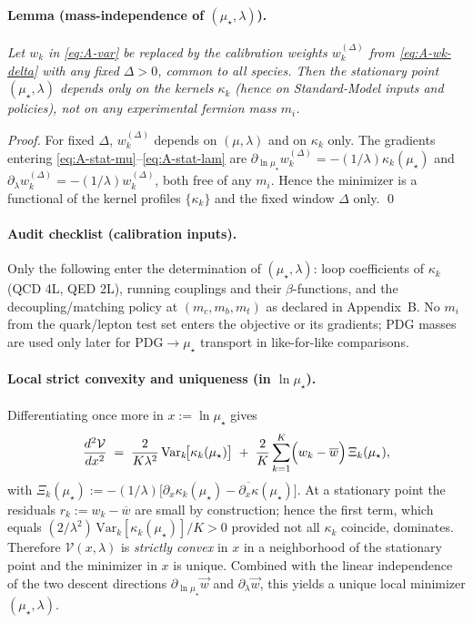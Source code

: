 \documentclass[epjc3]{svjour3}
\begin{document}
\paragraph{Lemma (mass-independence of $(\mu_\star,\lambda)$).}
\emph{Let $w_k$ in \eqref{eq:A-var} be replaced by the calibration weights $w_k^{(\Delta)}$ from \eqref{eq:A-wk-delta} with any fixed $\Delta>0$, common to all species. Then the stationary point $(\mu_\star,\lambda)$ depends only on the kernels $\kappa_k$ (hence on Standard-Model inputs and policies), not on any experimental fermion mass $m_i$.}

\emph{Proof.} For fixed $\Delta$, $w_k^{(\Delta)}$ depends on $(\mu,\lambda)$ and on $\kappa_k$ only. The gradients entering \eqref{eq:A-stat-mu}--\eqref{eq:A-stat-lam} are $\partial_{\ln\mu_\star} w_k^{(\Delta)}=-(1/\lambda)\kappa_k(\mu_\star)$ and $\partial_{\lambda} w_k^{(\Delta)}=-(1/\lambda)w_k^{(\Delta)}$, both free of any $m_i$. Hence the minimizer is a functional of the kernel profiles $\{\kappa_k\}$ and the fixed window $\Delta$ only. \qed

\paragraph{Audit checklist (calibration inputs).}
Only the following enter the determination of $(\mu_\star,\lambda)$: loop coefficients of $\kappa_k$ (QCD 4L, QED 2L), running couplings and their $\beta$-functions, and the decoupling/matching policy at $(m_c,m_b,m_t)$ as declared in Appendix~B. No $m_i$ from the quark/lepton test set enters the objective or its gradients; PDG masses are used only later for PDG$\to\mu_\star$ transport in like-for-like comparisons.

\paragraph{Local strict convexity and uniqueness (in $\ln\mu_\star$).}
Differentiating once more in $x:=\ln\mu_\star$ gives
\begin{equation}
  \frac{d^2\mathcal V}{dx^2}
  \;=\;\frac{2}{K\lambda^2}\,\mathrm{Var}_k\!\bigl[\kappa_k(\mu_\star)\bigr]
  \;+\;\frac{2}{K}\sum_{k=1}^K\Bigl(w_k-\overline{w}\Bigr)\,\Xi_k(\mu_\star),
  \label{eq:A-Vpp}
\end{equation}
with $\Xi_k(\mu_\star):=-(1/\lambda)\bigl[\partial_x\kappa_k(\mu_\star)-\overline{\partial_x\kappa}(\mu_\star)\bigr]$.
At a stationary point the residuals $r_k:=w_k-\overline{w}$ are small by construction; hence the first term, which equals $(2/\lambda^2)\,\mathrm{Var}_k[\kappa_k(\mu_\star)]/K>0$ provided not all $\kappa_k$ coincide, dominates. Therefore $\mathcal V(x,\lambda)$ is \emph{strictly convex} in $x$ in a neighborhood of the stationary point and the minimizer in $x$ is unique. Combined with the linear independence of the two descent directions $\partial_{\ln\mu_\star}\vec w$ and $\partial_\lambda \vec w$, this yields a unique local minimizer $(\mu_\star,\lambda)$.
\end{document}

